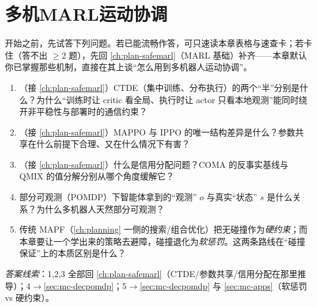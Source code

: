 \chapter{多机MARL运动协调}
\label{ch:mr-marl-coord}



\begin{practice}[前置自测]
开始之前，先试答下列问题。若已能流畅作答，可只速读本章表格与速查卡；若卡住（答不出 $\ge 2$ 题），先回 \cref{ch:plan-safemarl}（MARL 基础）补齐——本章默认你已掌握那些机制，直接在其上谈“怎么用到多机器人运动协调”。
\begin{enumerate}
  \item （接 \cref{ch:plan-safemarl}）CTDE（集中训练、分布执行）的两个“半”分别是什么？为什么“训练时让 critic 看全局、执行时让 actor 只看本地观测”能同时绕开非平稳性与部署时的通信约束？
  \item （接 \cref{ch:plan-safemarl}）MAPPO 与 IPPO 的唯一结构差异是什么？参数共享在什么前提下合理、又在什么情况下有害？
  \item （接 \cref{ch:plan-safemarl}）什么是信用分配问题？COMA 的反事实基线与 QMIX 的值分解分别从哪个角度缓解它？
  \item 部分可观测（POMDP）下智能体拿到的“观测” $o$ 与真实“状态” $s$ 是什么关系？为什么多机器人天然部分可观测？
  \item 传统 MAPF（\cref{ch:planning} 一侧的搜索/组合优化）把无碰撞作为\emph{硬约束}；而本章要让一个学出来的策略去避障，碰撞退化为\emph{软惩罚}。这两条路线在“碰撞保证”上的本质区别是什么？
\end{enumerate}
\noindent\emph{答案线索}：1,2,3 全部回 \cref{ch:plan-safemarl}（CTDE/参数共享/信用分配在那里推导）；4$\to$\cref{sec:mc-decpomdp}；5$\to$\cref{sec:mc-decpomdp} 与 \cref{sec:mc-apps}（软惩罚 vs 硬约束）。
\end{practice}

